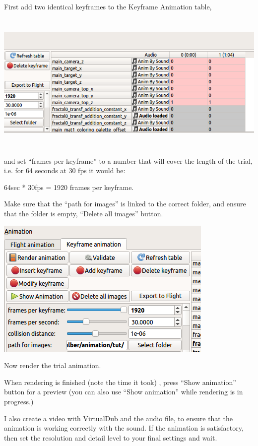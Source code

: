 First add two identical keyframes to the Keyframe Animation table,

\includegraphics[width=6.69291in,height=2.69291in]{img/sound/media/image9.png}

and set ``frames per keyframe'' to a number that will cover the length
of the trial, i.e. for 64 seconds at 30 fps it would be:

64sec * 30fps = 1920 frames per keyframe.

Make sure that the ``path for images'' is linked to the correct folder,
and ensure that the folder is empty, ``Delete all images'' button.

\includegraphics[width=4.13543in,height=2.64567in]{img/sound/media/image10.png}

Now render the trial animation.

When rendering is finished (note the time it took) , press ``Show
animation'' button for a preview (you can also use ``Show animation''
while rendering is in progress.)

I also create a video with VirtualDub and the audio file, to ensure that
the animation is working correctly with the sound. If the animation is
satisfactory, then set the resolution and detail level to your final
settings and wait.
